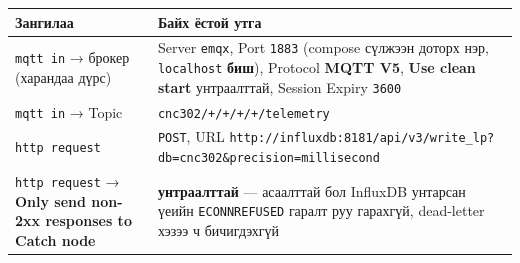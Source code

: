 \begingroup\scriptsize\begin{longtable}[]{@{}ll@{}}
\toprule
\begin{minipage}[b]{0.47\columnwidth}\raggedright
Зангилаа\strut
\end{minipage} & \begin{minipage}[b]{0.47\columnwidth}\raggedright
Байх ёстой утга\strut
\end{minipage}\tabularnewline
\midrule
\endhead
\begin{minipage}[t]{0.47\columnwidth}\raggedright
\texttt{mqtt\ in} → брокер (харандаа дүрс)\strut
\end{minipage} & \begin{minipage}[t]{0.47\columnwidth}\raggedright
Server \texttt{emqx}, Port \texttt{1883} (compose сүлжээн доторх нэр, \texttt{localhost} \textbf{биш}), Protocol \textbf{MQTT V5}, \textbf{Use clean start} унтраалттай, Session Expiry \texttt{3600}\strut
\end{minipage}\tabularnewline
\begin{minipage}[t]{0.47\columnwidth}\raggedright
\texttt{mqtt\ in} → Topic\strut
\end{minipage} & \begin{minipage}[t]{0.47\columnwidth}\raggedright
\texttt{cnc302/\allowbreak{}+/\allowbreak{}+/\allowbreak{}+/\allowbreak{}+/\allowbreak{}telemetry}\strut
\end{minipage}\tabularnewline
\begin{minipage}[t]{0.47\columnwidth}\raggedright
\texttt{http\ request}\strut
\end{minipage} & \begin{minipage}[t]{0.47\columnwidth}\raggedright
\texttt{POST}, URL \texttt{http:\allowbreak{}/\allowbreak{}/\allowbreak{}influxdb:\allowbreak{}8181/\allowbreak{}api/\allowbreak{}v3/\allowbreak{}write\_\allowbreak{}lp?\allowbreak{}db=\allowbreak{}cnc302\&\allowbreak{}precision=\allowbreak{}millisecond}\strut
\end{minipage}\tabularnewline
\begin{minipage}[t]{0.47\columnwidth}\raggedright
\texttt{http\ request} → \textbf{Only send non-2xx responses to Catch node}\strut
\end{minipage} & \begin{minipage}[t]{0.47\columnwidth}\raggedright
\textbf{унтраалттай} --- асаалттай бол InfluxDB унтарсан үеийн \texttt{ECONNREFUSED} гаралт руу гарахгүй, dead-letter хэзээ ч бичигдэхгүй\strut
\end{minipage}\tabularnewline
\bottomrule
\end{longtable}\endgroup

